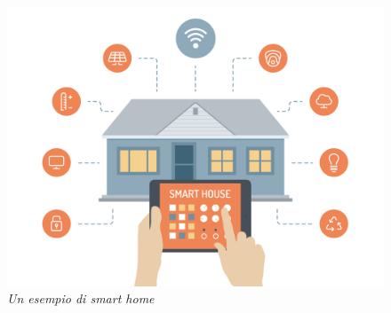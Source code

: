 \begin{figure}[H]
\centering
\includegraphics[scale=0.25]{immagini/Smart-Home.jpg}
\caption{\textit{Un esempio di smart home}}
\end{figure}

